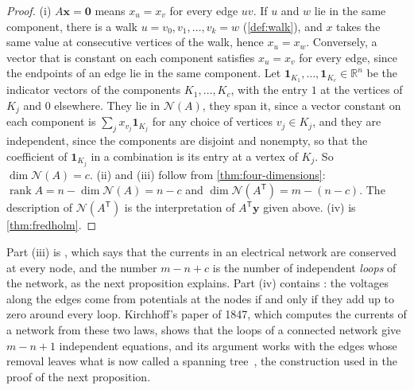 \begin{proof}
(i) $A\mathbf x=\mathbf 0$ means $x_u=x_v$ for every edge $uv$. If $u$ and $w$ lie in the same component, there is a walk $u=v_0,v_1,\ldots,v_k=w$ (\cref{def:walk}), and $x$ takes the same value at consecutive vertices of the walk, hence $x_u=x_w$. Conversely, a vector that is constant on each component satisfies $x_u=x_v$ for every edge, since the endpoints of an edge lie in the same component. Let $\mathbf 1_{K_1},\ldots,\mathbf 1_{K_c}\in\mathbb R^n$ be the indicator vectors of the components $K_1,\ldots,K_c$, with the entry $1$ at the vertices of $K_j$ and $0$ elsewhere. They lie in $\mathcal N(A)$, they span it, since a vector constant on each component is $\sum_jx_{v_j}\mathbf 1_{K_j}$ for any choice of vertices $v_j\in K_j$, and they are independent, since the components are disjoint and nonempty, so that the coefficient of $\mathbf 1_{K_j}$ in a combination is its entry at a vertex of $K_j$. So $\dim\mathcal N(A)=c$. (ii) and (iii) follow from \cref{thm:four-dimensions}: $\operatorname{rank}A=n-\dim\mathcal N(A)=n-c$ and $\dim\mathcal N(A^{\mathsf T})=m-(n-c)$. The description of $\mathcal N(A^{\mathsf T})$ is the interpretation of $A^{\mathsf T}\mathbf y$ given above. (iv) is \cref{thm:fredholm}.
\end{proof}

Part (iii) is , which says that the currents in an electrical network are conserved at every node, and the number $m-n+c$ is the number of independent \emph{loops} of the network, as the next proposition explains. Part (iv) contains : the voltages along the edges come from potentials at the nodes if and only if they add up to zero around every loop. Kirchhoff's paper of 1847, which computes the currents of a network from these two laws, shows that the loops of a connected network give $m-n+1$ independent equations, and its argument works with the edges whose removal leaves what is now called a spanning tree~\cite{kirchhoff1847,kirby2016}, the construction used in the proof of the next proposition.

